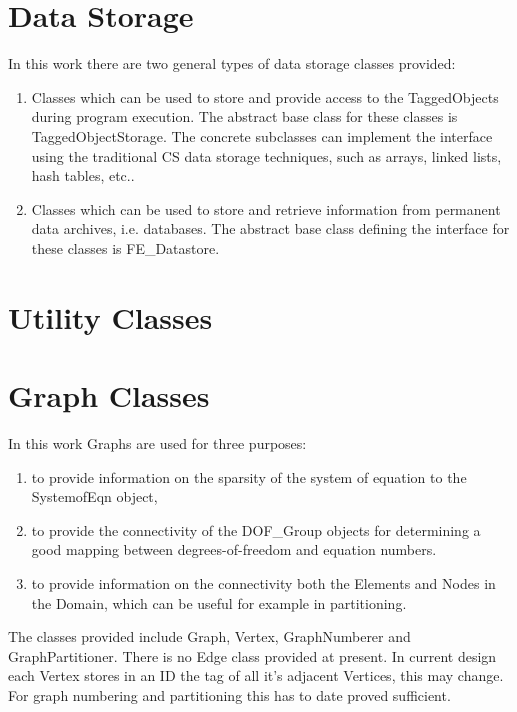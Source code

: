 \pagebreak 





\section{Data Storage} 
In this work there are two general types of data storage classes provided: 
\begin{enumerate}
\item Classes which can be used to store and provide access to the TaggedObjects
during program execution. The abstract base class for these classes is
TaggedObjectStorage. The concrete subclasses can implement the
interface using the traditional CS data storage techniques, such as
arrays, linked lists, hash tables, etc..
\item Classes which can be used to store and retrieve information from
permanent data archives, i.e. databases. The abstract base class
defining the interface for these classes is FE\_Datastore.
\end{enumerate}

\pagebreak 
\pagebreak


\pagebreak
\section{Utility Classes}
\pagebreak 
\pagebreak 
\pagebreak 


\pagebreak
\section{Graph Classes}
In this work Graphs are used for three purposes: \begin{enumerate} 
\item to provide information on the sparsity of the system of equation 
to the SystemofEqn object, 
\item to provide the connectivity of the DOF\_Group objects for determining
a good mapping between degrees-of-freedom and equation numbers.
\item to provide information on the connectivity both the Elements and Nodes
in the Domain, which can be useful for example in partitioning.
\end{enumerate}

The classes provided include Graph, Vertex, GraphNumberer and 
GraphPartitioner. There is no Edge class provided at present. In current 
design each Vertex stores in an ID the tag of all it's adjacent Vertices, 
this may change. For graph numbering and partitioning this has to date 
proved sufficient.

\pagebreak


\pagebreak




